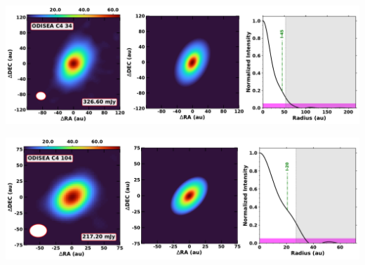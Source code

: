 \noindent
\begin{minipage}{.49\textwidth}
	 \centering
	 	 \hrulesep
	 	 \includegraphics[width=1\linewidth]{pdf/1+II/087_odisea_c4_34_cutout.pdf}
\end{minipage}%
\vrulesep
\begin{minipage}{.49\textwidth}
	 \centering
	 	 \hrulesep
	 	 \includegraphics[width=1\linewidth]{pdf/1+II/082_odisea_c4_104_cutout.pdf}
\end{minipage}%
\vspace{0pt}
\noindent{}%
\vspace{0.8cm}